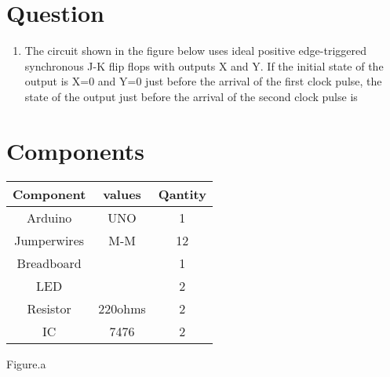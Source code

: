 \documentclass[journal,12pt]{article}
\title{\mytitle}
\author{\myauthor\hspace{1em}\\\contact\\IITH\hspace{0.5em}-\hspace{0.6em}\mymodule}
\date{20-07-2023}
\begin{document}
\theoremstyle{definition}
\newtheorem{theorem}{Theorem}[section]
\newtheorem{problem}{Problem}
\newtheorem{proposition}{Proposition}[section]
\newtheorem{lemma}{Lemma}[section]
\newtheorem{corollary}[theorem]{Corollary}
\newtheorem{example}{Example}[section]
\newtheorem{definition}{Definition}[section]
\newcommand{\BEQA}{\begin{eqnarray}}
\newcommand{\EEQA}{\end{eqnarray}}
\newcommand{\define}{\stackrel{\triangle}{=}}

\vspace{3cm}
\maketitle
\tableofcontents
\pagebreak
\section{Question}
\begin{enumerate}
    \item The circuit shown in the figure below uses ideal positive edge-triggered synchronous J-K flip flops with outputs X and Y. If the initial state of the output is X=0 and Y=0 just before the arrival of the first clock pulse, the state of the output just before the arrival of the second clock pulse is
\end{enumerate}
\begin{figure}[h]
        \centering
	
	\caption{}
\end{figure}
\section{Components}
\begin{table}[h]
\centering
\begin{tabular}{|c|c|c|}
\hline
  \textbf{Component}& \textbf{values} & \textbf{Qantity}\\
\hline
  Arduino & UNO & 1 \\
\hline
  Jumperwires & M-M & 12 \\
\hline
  Breadboard & & 1 \\
\hline
  LED & & 2\\
\hline
  Resistor & 220ohms & 2 \\
\hline
  IC & 7476 & 2 \\
\hline
\end{tabular}
\end{table}
\begin{center}
Figure.a
\end{center}
\end{document}
